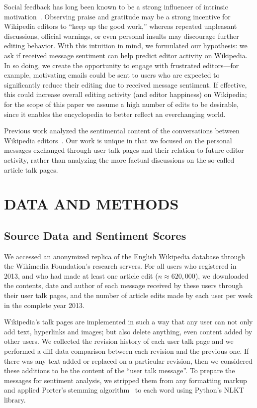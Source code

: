 \documentclass[letterpaper, 10 pt, conference]{ieeeconf}  %
\begin{document}
Social feedback has long been known to be a strong influencer of intrinsic motivation~\cite{c4, c5}. Observing praise and gratitude may be a strong incentive for Wikipedia editors to ``keep up the good work,'' whereas repeated unpleasant discussions, official warnings, or even personal insults may discourage further editing behavior. With this intuition in mind, we formulated our hypothesis: we ask if received message sentiment can help predict editor activity on Wikipedia. In so doing, we create the opportunity to engage with frustrated editors---for example, motivating emails could be sent to users who are expected to significantly reduce their editing due to received message sentiment. If effective, this could increase overall editing activity (and editor happiness) on Wikipedia; for the scope of this paper we assume a high number of edits to be desirable, since it enables the encyclopedia to better reflect an everchanging world.

Previous work analyzed the sentimental content of the conversations between Wikipedia editors~\cite{c3, c10}. Our work is unique in that we focused on the personal messages exchanged through user talk pages and their relation to future editor activity, rather than analyzing the more factual discussions on the so-called article talk pages.

\section{DATA AND METHODS}

\subsection{Source Data and Sentiment Scores}

We accessed an anonymized replica of the English Wikipedia database through the Wikimedia Foundation's research servers\cite{toollabs}. For all users who registered in 2013, and who had made at least one article edit ($n \approx 620,000$), we downloaded the contents, date and author of each message received by these users through their user talk pages, and the number of article edits made by each user per week in the complete year 2013.

Wikipedia's talk pages are implemented in such a way that any user can not only add text, hyperlinks and images; but also delete anything, even content added by other users. We collected the revision history of each user talk page and we performed a diff data comparison between each revision and the previous one. If there was any text added or replaced on a particular revision, then we considered these additions to be the content of the ``user talk message''. To prepare the messages for sentiment analysis, we stripped them from any formatting markup~\cite{c7} and applied Porter's stemming algorithm~\cite{c11} to each word using Python's NLKT library.
\end{document}
